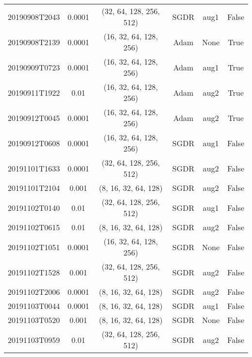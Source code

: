 \begin{table}[!ht]
\begin{adjustbox}{width=\columnwidth, center}
\begin{tabular}{cccccc}
			20190908T2043 &       0.0001 &  (32, 64, 128, 256, 512) &      SGDR &                  aug1 &                  False \\
			20190908T2139 &       0.0001 &   (16, 32, 64, 128, 256) &      Adam &                  None &                   True \\
			20190909T0723 &       0.0001 &   (16, 32, 64, 128, 256) &      Adam &                  aug1 &                   True \\
			20190911T1922 &         0.01 &   (16, 32, 64, 128, 256) &      Adam &                  aug2 &                   True \\
			20190912T0045 &       0.0001 &   (16, 32, 64, 128, 256) &      Adam &                  aug2 &                   True \\
			20190912T0608 &       0.0001 &   (16, 32, 64, 128, 256) &      SGDR &                  aug1 &                  False \\
			20191101T1633 &       0.0001 &  (32, 64, 128, 256, 512) &      SGDR &                  aug2 &                  False \\
			20191101T2104 &        0.001 &     (8, 16, 32, 64, 128) &      SGDR &                  aug2 &                  False \\
			20191102T0140 &         0.01 &  (32, 64, 128, 256, 512) &      SGDR &                  aug1 &                  False \\
			20191102T0615 &         0.01 &     (8, 16, 32, 64, 128) &      SGDR &                  aug2 &                  False \\
			20191102T1051 &       0.0001 &   (16, 32, 64, 128, 256) &      SGDR &                  None &                  False \\
			20191102T1528 &        0.001 &  (32, 64, 128, 256, 512) &      SGDR &                  aug2 &                  False \\
			20191102T2006 &       0.0001 &     (8, 16, 32, 64, 128) &      SGDR &                  aug2 &                  False \\
			20191103T0044 &       0.0001 &     (8, 16, 32, 64, 128) &      SGDR &                  aug1 &                  False \\
			20191103T0520 &        0.001 &     (8, 16, 32, 64, 128) &      SGDR &                  None &                  False \\
			20191103T0959 &         0.01 &  (32, 64, 128, 256, 512) &      SGDR &                  aug2 &                  False \\

\end{tabular}
\end{adjustbox}
\end{table}
